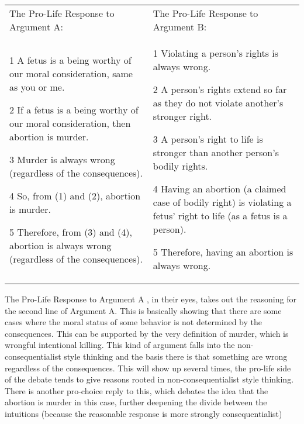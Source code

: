 \noindent
\begin{tabular}{p{2.75in}|p{2.75in}}
The Pro-Life Response to Argument A:&The Pro-Life Response to Argument B:\\
\begin{earg}
    \item[1 ] A fetus is a being worthy of our moral consideration, same as you or me.
    \item[2 ] If a fetus is a being worthy of our moral consideration, then abortion is murder.
    \item[3 ] Murder is always wrong (regardless of the consequences).
    \item[4 ] So, from (1) and (2), abortion is murder.
    \item[5 ] Therefore, from (3) and (4), abortion is always wrong (regardless of the consequences). 
\end{earg}&
\begin{earg}
    \item[1 ] Violating a person's rights is always wrong.
    \item[2 ] A person's rights extend so far as they do not violate another's stronger right.
    \item[3 ] A person's right to life is stronger than another person's bodily rights.
    \item[4 ] Having an abortion (a claimed case of bodily right) is violating a fetus' right to life (as a fetus is a person).
    \item[5 ] Therefore, having an abortion is always wrong.
\end{earg}
\end{tabular}

The Pro-Life Response to Argument A , in their eyes, takes out the reasoning for the second line of Argument A. This is basically showing that there are some cases where the moral status of some behavior is not determined by the consequences. This can be supported by the very definition of murder, which is wrongful intentional killing. This kind of argument falls into the non-consequentialist style thinking and the basis there is that something are wrong regardless of the consequences. This will show up several times, the pro-life side of the debate tends to give reasons rooted in non-consequentialist style thinking. There is another pro-choice reply to this, which debates the idea that the abortion is murder in this case, further deepening the divide between the intuitions (because the reasonable response is more strongly consequentialist) 

